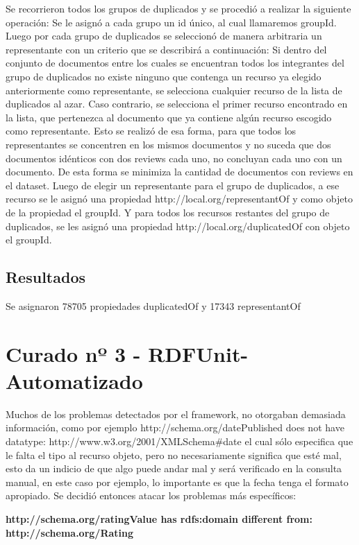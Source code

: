 Se recorrieron todos los grupos de duplicados y se procedió a realizar la siguiente operación:
Se le asignó a cada grupo un id único, al cual llamaremos groupId.
Luego por cada grupo de duplicados se seleccionó de manera arbitraria un representante con un criterio que se describirá a continuación:
Si dentro del conjunto de documentos entre los cuales se encuentran todos los integrantes del grupo de duplicados no existe ninguno 
que contenga un recurso ya elegido anteriormente como representante, se selecciona cualquier recurso de la lista de duplicados al azar.
Caso contrario, se selecciona el primer recurso encontrado en la lista, que pertenezca al documento que ya contiene algún recurso escogido 
como representante.
Esto se realizó de esa forma, para que todos los representantes se concentren en los mismos documentos y no suceda que dos 
documentos idénticos con dos reviews cada uno, no concluyan cada uno con un documento. De esta forma se minimiza la cantidad de 
documentos con reviews en el dataset.
Luego de elegir un representante para el grupo de duplicados, a ese recurso se le asignó una propiedad http://local.org/representantOf y 
como objeto de la propiedad el groupId.
Y para todos los recursos restantes del grupo de duplicados, se les asignó una propiedad http://local.org/duplicatedOf con objeto 
el groupId.

\subsection*{Resultados}

Se asignaron 78705 propiedades duplicatedOf y 17343 representantOf

\section{Curado nº 3 - RDFUnit-Automatizado}
\label{section:curado-automatizado}

Muchos de los problemas detectados por el framework, no otorgaban demasiada información, como por ejemplo
http://schema.org/datePublished does not have datatype: http://www.w3.org/2001/XMLSchema\#date el cual sólo especifica que le 
falta el tipo al recurso objeto, pero no necesariamente significa que esté mal, esto da un indicio de que algo puede andar mal
y será verificado en la consulta manual, en este caso por ejemplo, lo importante es que la fecha tenga el formato apropiado.
Se decidió entonces atacar los problemas más específicos:

\textbf{http://schema.org/ratingValue has rdfs:domain different from: \\\noindent http://schema.org/Rating}

